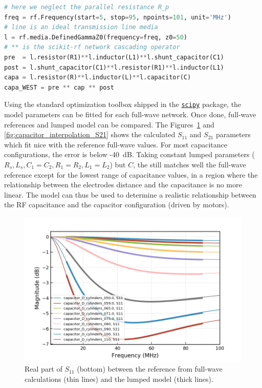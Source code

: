 {\begin{lstlisting}[language=Python]
# here we neglect the parallel resistance R_p
freq = rf.Frequency(start=5, stop=95, npoints=101, unit='MHz')
# line is an ideal transmission line media
l = rf.media.DefinedGammaZ0(frequency=freq, z0=50)  
# ** is the scikit-rf network cascading operator
pre  = l.resistor(R1)**l.inductor(L1)**l.shunt_capacitor(C1)
post = l.shunt_capacitor(C1)**l.resistor(R1)**l.inductor(L1)
capa = l.resistor(R)**l.inductor(L)**l.capacitor(C)
capa_WEST = pre ** cap ** post  
\end{lstlisting}

Using the standard optimization toolbox shipped in the \href{https://www.scipy.org/}{\texttt{scipy}} package, the model parameters can be fitted for each full-wave network. Once done, full-wave references and lumped model can be compared. The Figures~\ref{fig:capacitor_interpolation_S11} and \ref{fig:capacitor_interpolation_S21} shows the calculated $S_{11}$ and $S_{21}$ parameters which fit nice with the reference full-wave values. For most capacitance configurations, the error is below -40~dB. Taking constant lumped parameters ($R_s, L_s, C_1=C_2, R_1=R_2, L_1=L_2$) but $C$, the still matches well the full-wave reference except for the lowest range of capacitance values, in a region where the relationship between the electrodes distance and the capacitance is no more linear. The model can thus be used to determine a realistic relationship between the RF capacitance and the capacitor configuration (driven by motors).

\begin{figure}
	\centering
	\includegraphics[width=1.0\linewidth]{figures/chap3/WEST_ICRH/comparison_fullwave_lumped_S11}
	\caption{Real part of $S_{11}$ (bottom) between the reference from full-wave  calculations (thin lines) and the lumped model (thick lines).}
	\label{fig:capacitor_interpolation_S11}
\end{figure}

}
